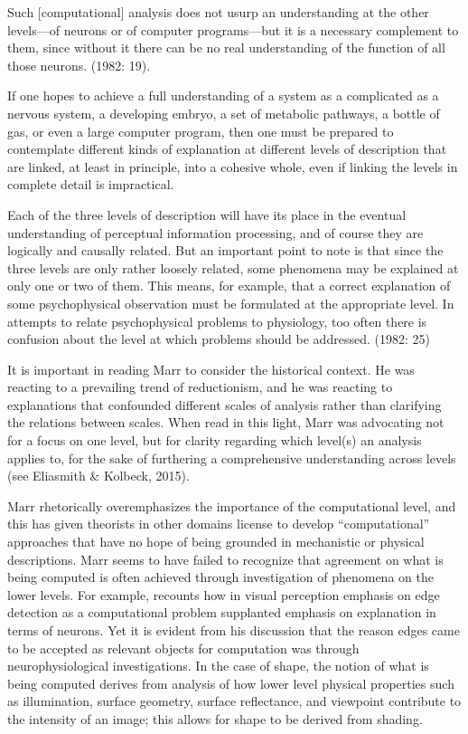 Such [computational] analysis does not usurp an understanding at the other levels—of neurons or of computer programs—but it is a necessary complement to them, since without it there can be no real understanding of the function of all those neurons. (1982: 19).

If one hopes to achieve a full understanding of a system as a complicated as a nervous system, a developing embryo, a set of metabolic pathways, a bottle of gas, or even a large computer program, then one must be prepared to contemplate different kinds of explanation at different levels of description that are linked, at least in principle, into a cohesive whole, even if linking the levels in complete detail is impractical.

Each of the three levels of description will have its place in the eventual understanding of perceptual information processing, and of course they are logically and causally related. But an important point to note is that since the three levels are only rather loosely related, some phenomena may be explained at only one or two of them. This means, for example, that a correct explanation of some psychophysical observation must be formulated at the appropriate level. In attempts to relate psychophysical problems to physiology, too often there is confusion about the level at which problems should be addressed. (1982: 25)

It is important in reading Marr to consider the historical context. He was reacting to a prevailing trend of reductionism, and he was reacting to explanations that confounded different scales of analysis rather than clarifying the relations between scales. When read in this light, Marr was advocating not for a focus on one level, but for clarity regarding which level(s) an analysis applies to, for the sake of furthering a comprehensive understanding across levels (see Eliasmith \& Kolbeck, 2015). 

  Marr rhetorically overemphasizes the importance of the computational level, and this has given theorists in other domains license to develop “computational” approaches that have no hope of being grounded in mechanistic or physical descriptions. Marr seems to have failed to recognize that agreement on what is being computed is often achieved through investigation of phenomena on the lower levels. For example, \citet{Marr1982} recounts how in visual perception emphasis on edge detection as a computational problem supplanted emphasis on explanation in terms of neurons. Yet it is evident from his discussion that the reason edges came to be accepted as relevant objects for computation was through neurophysiological investigations. In the case of shape, the notion of what is being computed derives from analysis of how lower level physical properties such as illumination, surface geometry, surface reflectance, and viewpoint contribute to the intensity of an image; this allows for shape to be derived from shading. 

